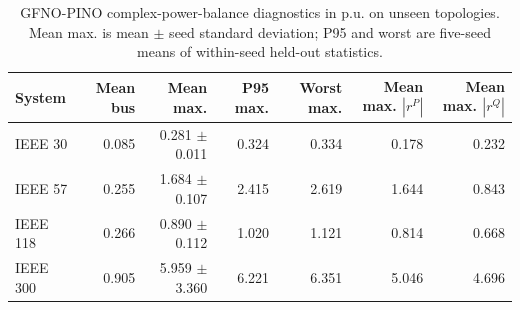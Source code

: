 \begin{table}[t]
\centering
\caption{GFNO-PINO complex-power-balance diagnostics in p.u. on unseen topologies. Mean max. is mean $\pm$ seed standard deviation; P95 and worst are five-seed means of within-seed held-out statistics.}
\label{tab:balance}
\scriptsize
\begin{tabular}{lrrrrrr}
\toprule
System & Mean bus & Mean max. & P95 max. & Worst max. & Mean max. $|r^P|$ & Mean max. $|r^Q|$ \\
\midrule
IEEE 30 & 0.085 & 0.281 $\pm$ 0.011 & 0.324 & 0.334 & 0.178 & 0.232 \\
IEEE 57 & 0.255 & 1.684 $\pm$ 0.107 & 2.415 & 2.619 & 1.644 & 0.843 \\
IEEE 118 & 0.266 & 0.890 $\pm$ 0.112 & 1.020 & 1.121 & 0.814 & 0.668 \\
IEEE 300 & 0.905 & 5.959 $\pm$ 3.360 & 6.221 & 6.351 & 5.046 & 4.696 \\
\bottomrule
\end{tabular}
\end{table}
